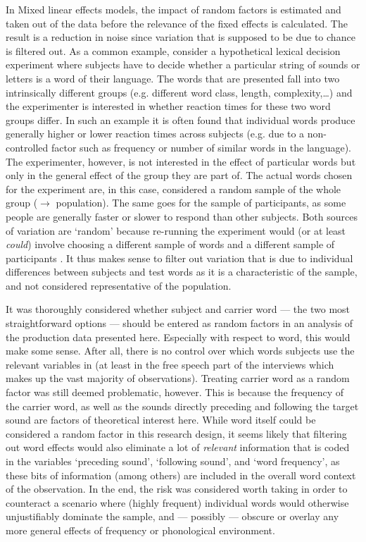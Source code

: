 In Mixed linear effects models, the impact of random factors is estimated and taken out of the data before the relevance of the fixed effects is calculated.
The result is a reduction in noise since variation that is supposed to be due to chance is filtered out.
As a common example, consider a hypothetical lexical decision experiment where subjects have to decide whether a particular string of sounds or letters is a word of their language.
The words that are presented fall into two intrinsically different groups (e.g. different word class, length, complexity,\ldots) and the experimenter is interested in whether reaction times for these two word groups differ.
In such an example it is often found that individual words produce generally higher or lower reaction times across subjects (e.g. due to a non-controlled factor such as frequency or number of similar words in the language).
The experimenter, however, is not interested in the effect of particular words but only in the general effect of the group they are part of.
The actual words chosen for the experiment are, in this case, considered a random sample of the whole group (\(\rightarrow\) population).
The same goes for the sample of participants, as some people are generally faster or slower to respond than other subjects.
Both sources of variation are `random' because re-running the experiment would (or at least \emph{could}) involve choosing a different sample of words and a different sample of participants \parencite[cf.][259--260]{barretal2013}.
It thus makes sense to filter out variation that is due to individual differences between subjects and test words as it is a characteristic of the sample, and not considered representative of the population.

It was thoroughly considered whether subject and carrier word --- the two most straightforward options --- should be entered as random factors in an analysis of the production data presented here.
Especially with respect to word, this would make some sense.
After all, there is no control over which words subjects use the relevant variables in (at least in the free speech part of the interviews which makes up the vast majority of observations).
Treating carrier word as a random factor was still deemed problematic, however.
This is because the frequency of the carrier word, as well as the sounds directly preceding and following the target sound are factors of theoretical interest here.
While word itself could be considered a random factor in this research design, it seems likely that filtering out word effects would also eliminate a lot of \emph{relevant} information that is coded in the variables `preceding sound', `following sound', and `word frequency', as these bits of information (among others) are included in the overall word context of the observation.
In the end, the risk was considered worth taking in order to counteract a scenario where (highly frequent) individual words would otherwise unjustifiably dominate the sample, and --- possibly --- obscure or overlay any more general effects of frequency or phonological environment.

